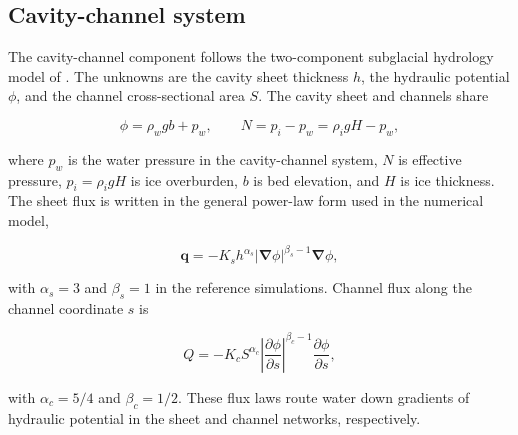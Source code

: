 \documentclass[draft]{agujournal2019}
\newcommand{\Grad}{\boldsymbol{\nabla}}
\newcommand{\pdiff}[2]{\frac{\partial{#1}}{\partial{#2}}}
\begin{document}
\subsection{Cavity-channel system}\label{sec:method_cavity_channel}
The cavity-channel component follows the two-component subglacial hydrology model of . The unknowns are the cavity sheet thickness $h$, the hydraulic potential $\phi$, and the channel cross-sectional area $S$. The cavity sheet and channels share
\begin{linenomath*}
\begin{equation}\label{eq:hydraulic_potential_cavity}
    \phi = \rho_w g b + p_w,
    \qquad
    N = p_i-p_w = \rho_i g H-p_w,
\end{equation}
\end{linenomath*}
where $p_w$ is the water pressure in the cavity-channel system, $N$ is effective pressure, $p_i=\rho_i gH$ is ice overburden, $b$ is bed elevation, and $H$ is ice thickness. The sheet flux is written in the general power-law form used in the numerical model,
\begin{linenomath*}
\begin{equation}\label{eq:sheet_flux}
    \boldsymbol{q}
    =-K_s h^{\alpha_s}\left|\Grad\phi\right|^{\beta_s-1}\Grad\phi,
\end{equation}
\end{linenomath*}
with $\alpha_s=3$ and $\beta_s=1$ in the reference simulations. Channel flux along the channel coordinate $s$ is
\begin{linenomath*}
\begin{equation}\label{eq:channel_flux}
    Q
    =-K_c S^{\alpha_c}\left|\pdiff{\phi}{s}\right|^{\beta_c-1}\pdiff{\phi}{s},
\end{equation}
\end{linenomath*}
with $\alpha_c=5/4$ and $\beta_c=1/2$. These flux laws route water down gradients of hydraulic potential in the sheet and channel networks, respectively.
\end{document}
